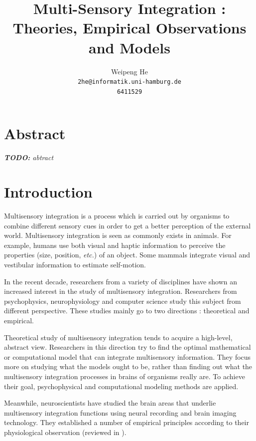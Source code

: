 \documentclass{article}[11pt]
\title{Multi-Sensory Integration : Theories, Empirical Observations and Models}
\author{Weipeng He \\ \texttt{2he@informatik.uni-hamburg.de} \\ \texttt{6411529}}
\newcommand{\TODO}[1]{\emph{\small{{\bf TODO: } #1}}}
\newcommand{\etc}{\textit{etc.}}
\begin{document}
\maketitle

\section*{Abstract}
\TODO{abtract}


\section{Introduction}
\label{sec:intro}

Multisensory integration is a process which is carried out by organisms to combine different sensory cues in order to get a better perception of the external world. 
Multisensory integration is seen as commonly exists in animals. For example, humans use both visual and haptic information to perceive the properties (size, position, \etc) of an object\cite{ernst_humans_2002}. Some mammals integrate visual and vestibular information to estimate self-motion\cite{fetsch_dynamic_2009}.

In the recent decade, researchers from a variety of disciplines have shown an increased interest in the study of multisensory integration.
Researchers from psychophysics, neurophysiology and computer science study this subject from different perspective.
These studies mainly go to two directions : theoretical and empirical.

Theoretical study of multisensory integration tends to acquire a high-level, abstract view. Researchers in this direction try to find the optimal mathematical or computational model that can integrate multisensory information. They focus more on studying what the models ought to be, rather than finding out what the multisensory integration processes in brains of organisms really are.
To achieve their goal, psychophysical and computational modeling methods are applied.

Meanwhile, neuroscientists have studied the brain areas that underlie multisensory integration functions using neural recording and brain imaging technology. They established a number of empirical principles according to their physiological observation (reviewed in \cite{stein_multisensory_2008}).
\end{document}
